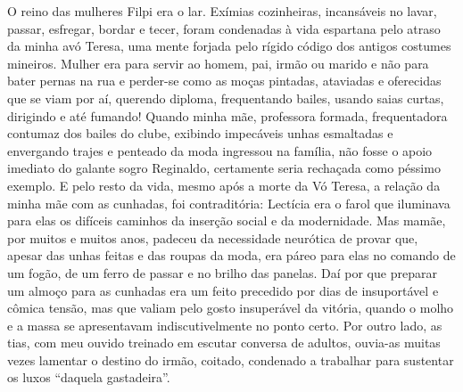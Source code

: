 O reino das mulheres Filpi era o lar. 
Exímias cozinheiras, incansáveis no lavar, passar, esfregar, bordar e tecer, foram condenadas à vida espartana pelo atraso da minha avó Teresa, uma mente forjada pelo rígido código dos antigos costumes mineiros. 
Mulher era para servir ao homem, pai, irmão ou marido e não para bater pernas na rua e perder-se como as moças pintadas, ataviadas e oferecidas que se viam por aí, querendo diploma, frequentando bailes, usando saias curtas, dirigindo e até fumando! Quando minha mãe, professora formada, frequentadora contumaz dos bailes do clube, exibindo impecáveis unhas esmaltadas e envergando trajes e penteado da moda ingressou na família, não fosse o apoio imediato do galante sogro Reginaldo, certamente seria rechaçada como péssimo exemplo. 
E pelo resto da vida, mesmo após a morte da Vó Teresa, a relação da minha mãe com as cunhadas, foi contraditória: Lectícia era o farol que iluminava para elas os difíceis caminhos da inserção social e da modernidade. 
Mas mamãe, por muitos e muitos anos, padeceu da necessidade neurótica de provar que, apesar das unhas feitas e das roupas da moda, era páreo para elas no comando de um fogão, de um ferro de passar e no brilho das panelas. 
Daí por que preparar um almoço para as cunhadas era um feito precedido por dias de insuportável e cômica tensão, mas que valiam pelo gosto insuperável da vitória, quando o molho e a massa se apresentavam indiscutivelmente no ponto certo. 
Por outro lado, as tias, com meu ouvido treinado em escutar conversa de adultos, ouvia-as muitas vezes lamentar o destino do irmão, coitado, condenado a trabalhar para sustentar os luxos ``daquela gastadeira''.

